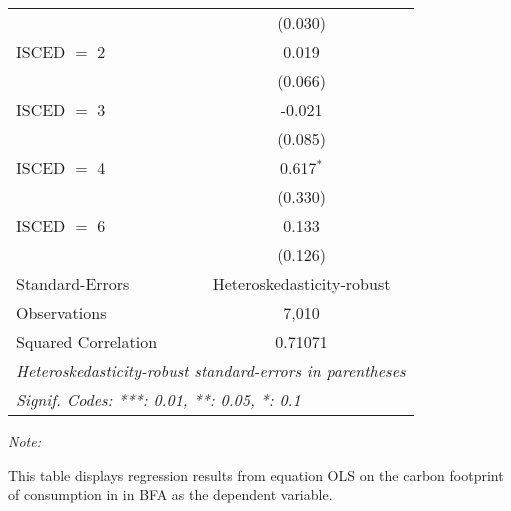 \begin{table}[htbp!]
\begin{adjustbox}{width = 1\textwidth, max height = 0.95\textheight, center}
\begin{threeparttable}[b]
\begin{tabular}{lc}
                                & (0.030)\\   
            ISCED $=$ 2         & 0.019\\   
                                & (0.066)\\   
            ISCED $=$ 3         & -0.021\\   
                                & (0.085)\\   
            ISCED $=$ 4         & 0.617$^{*}$\\   
                                & (0.330)\\   
            ISCED $=$ 6         & 0.133\\   
                                & (0.126)\\   
            \midrule 
            Standard-Errors     & Heteroskedasticity-robust \\   
            Observations        & 7,010\\  
            Squared Correlation & 0.71071\\  
            \midrule \midrule
            \multicolumn{2}{l}{\emph{Heteroskedasticity-robust standard-errors in parentheses}}\\
            \multicolumn{2}{l}{\emph{Signif. Codes: ***: 0.01, **: 0.05, *: 0.1}}\\
         \end{tabular}
         
         \begin{tablenotes}\item \medskip \textit{Note:}
            \item This table displays regression results from equation OLS on the carbon footprint of consumption in  in BFA as the dependent variable.  
         \end{tablenotes}
      \end{threeparttable}
   \end{adjustbox}
\end{table}


